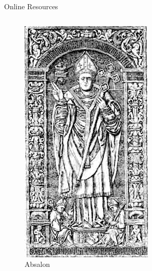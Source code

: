 \documentclass[
  ignorenonframetext,
  aspectratio=1610,
  onlytextwidth]{beamer}
\begin{document}
\begin{frame}{Online Resources}
\begin{columns}[T]
\begin{column}{0.25\linewidth}
\begin{figure}[H]
{\centering \includegraphics[width=1\linewidth,height=\textheight,keepaspectratio]{../images/absalon.jpg}

}

\caption{Absalon}

\end{figure}%
\end{column}
\end{columns}
\end{frame}
\end{document}
